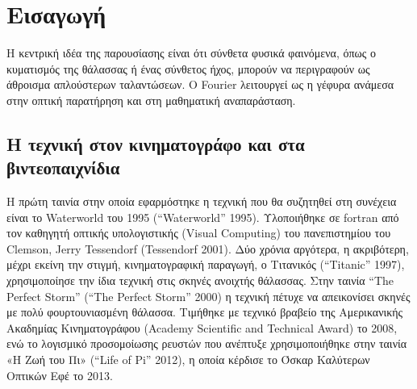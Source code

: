 \documentclass[a4paper, 11pt]{article}
\begin{document}


\begin{abstract}
Η παρουσίαση διερευνά πώς η θεωρία Fourier συνδέει τον ήχο, τα κύματα και τη σύγχρονη ψηφιακή προσομοίωση της θάλασσας. Αφετηρία αποτελούν παραδείγματα από τον κινηματογράφο και τα βιντεοπαιχνίδια, όπου οι επιφάνειες νερού δεν σχεδιάζονται κύμα-κύμα, αλλά προκύπτουν από φασματικά μοντέλα και αποδοτικούς αλγορίθμους. Ξεκινάμε από τα απλά κύματα και τη σύνθεση ήχων, προχωράμε στις μιγαδικές περιστροφές, συνεχίζουμε με τα αναπτύγματα Taylor και τον τύπο του Euler, και καταλήγουμε στους μετασχηματισμούς Fourier και την υπολογιστική τους υλοποίηση. Κάθε πολύπλοκο φαινόμενο μπορεί να αποσυντεθεί σε απλές ταλαντώσεις και να ανακατασκευαστεί από αυτές. Με αυτό το πρίσμα, παρουσιάζεται η ροή εργασίας για την απεικόνιση του ωκεανού επιλογή ενεργειακού φάσματος, εισαγωγή τυχαίων φάσεων, εξέλιξη στο πεδίο συχνοτήτων και τελική ανακατασκευή της επιφάνειας μέσω γρήγορου μετασχηματισμού Fourier.
\end{abstract}

\section{Εισαγωγή}\label{ux3b5ux3b9ux3c3ux3b1ux3b3ux3c9ux3b3ux3ae}

Η κεντρική ιδέα της παρουσίασης είναι ότι σύνθετα φυσικά φαινόμενα, όπως
ο κυματισμός της θάλασσας ή ένας σύνθετος ήχος, μπορούν να περιγραφούν
ως άθροισμα απλούστερων ταλαντώσεων. Ο Fourier λειτουργεί ως η γέφυρα
ανάμεσα στην οπτική παρατήρηση και στη μαθηματική αναπαράσταση.

\subsection{Η τεχνική στον κινηματογράφο και στα
βιντεοπαιχνίδια}\label{ux3b7-ux3c4ux3b5ux3c7ux3bdux3b9ux3baux3ae-ux3c3ux3c4ux3bfux3bd-ux3baux3b9ux3bdux3b7ux3bcux3b1ux3c4ux3bfux3b3ux3c1ux3acux3c6ux3bf-ux3baux3b1ux3b9-ux3c3ux3c4ux3b1-ux3b2ux3b9ux3bdux3c4ux3b5ux3bfux3c0ux3b1ux3b9ux3c7ux3bdux3afux3b4ux3b9ux3b1}

Η πρώτη ταινία στην οποία εφαρμόστηκε η τεχνική που θα συζητηθεί στη
συνέχεια είναι το Waterworld του 1995 ({``Waterworld''} 1995).
Υλοποιήθηκε σε fortran από τον καθηγητή οπτικής υπολογιστικής (Visual
Computing) του πανεπιστημίου του Clemson, Jerry Tessendorf (Tessendorf
2001). Δύο χρόνια αργότερα, η ακριβότερη, μέχρι εκείνη την στιγμή,
κινηματογραφική παραγωγή, ο Τιτανικός ({``Titanic''} 1997),
χρησιμοποίησε την ίδια τεχνική στις σκηνές ανοιχτής θάλασσας. Στην
ταινία ``The Perfect Storm'' ({``The Perfect Storm''} 2000) η τεχνική
πέτυχε να απεικονίσει σκηνές με πολύ φουρτουνιασμένη θάλασσα. Τιμήθηκε
με τεχνικό βραβείο της Αμερικανικής Ακαδημίας Κινηματογράφου (Academy
Scientific and Technical Award) το 2008, ενώ το λογισμικό προσομοίωσης
ρευστών που ανέπτυξε χρησιμοποιήθηκε στην ταινία «Η Ζωή του Πι» ({``Life
of Pi''} 2012), η οποία κέρδισε το Όσκαρ Καλύτερων Οπτικών Εφέ το 2013.
\end{document}
